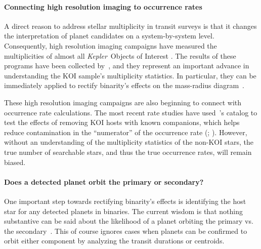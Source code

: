 \documentclass[12pt,modern]{aastex61}
\begin{document}
\paragraph{Connecting high resolution imaging to occurrence rates}
A direct reason to address stellar multiplicity in transit surveys is that it 
changes the interpretation of planet candidates on a system-by-system level.
Consequently, high resolution imaging 
campaigns have measured the multiplicities of almost all {\it Kepler}\ Objects 
of Interest 
\citep{howell_speckle_2011,adams_adaptive_2012,adams_adaptive_2013,horch_observations_2012,
    horch_most_2014,lillo-box_multiplicity_2012,lillo-box_high-resolution_2014,dressing_adaptive_2014,
    law_robotic_2014,cartier_revision_2015,everett_high-resolution_2015,gilliland_hubble_2015,
    wang_influence_2015,wang_influence_2015-1,baranec_robo-ao_2016,ziegler_robo-ao_2017}.
The results of these programs have been collected 
by~\citet{furlan_kepler_2017}, and they represent an important advance in 
understanding the KOI 
sample's multiplicity statistics.
In particular, they can be immediately applied to rectify binarity's effects 
on the mass-radius diagram~\citep{furlan_densities_2017}.

These high resolution imaging campaigns are also beginning to connect with
occurrence rate calculations.
The most recent rate studies have used~\citet{furlan_kepler_2017}'s 
catalog to test the effects of removing KOI hosts with known companions, which 
helps reduce contamination in the ``numerator'' of 
the occurrence rate (\citealt{fulton_california-_2017}; 
\citealt{petigura_CKS_2017}).
However, without an understanding of the multiplicity statistics of the 
non-KOI stars, the true number of searchable stars, and thus the true 
occurrence rates, will remain biased.

\paragraph{Does a detected planet orbit the primary or secondary?}
One important step towards rectifying binarity's effects is identifying the 
host star for any detected planets in binaries.
The current 
wisdom is that nothing substantive can be said about the 
likelihood of a planet orbiting the primary vs. the 
secondary~\citep[\textit{e.g.},][]{ciardi_understanding_2015,ziegler_robo-ao_2017}.
This of course ignores cases when planets can be confirmed to orbit either 
component by analyzing the transit durations or centroids.
\end{document}
